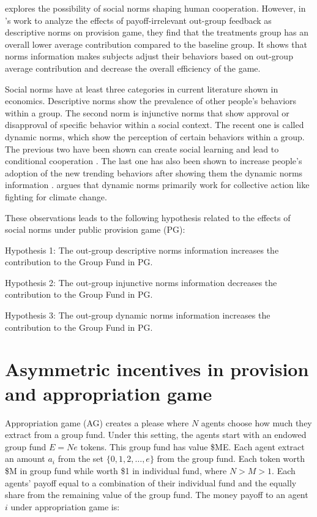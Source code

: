 \documentclass[12pt]{article}
\begin{document}
\cite{fehr2018normative} explores the possibility of social norms shaping human cooperation. However, in \cite{kandul2021public}'s work to analyze the effects of payoff-irrelevant out-group feedback as descriptive norms on provision game, they find that the treatments group has an overall lower average contribution compared to the baseline group. It shows that norms information makes subjects adjust their behaviors based on out-group average contribution and decrease the overall efficiency of the game. 

Social norms have at least three categories in current literature shown in economics. Descriptive norms show the prevalence of other people’s behaviors within a group. The second norm is injunctive norms that show approval or disapproval of specific behavior within a social context. The recent one is called dynamic norms, which show the perception of certain behaviors within a group. The previous two have been shown can create social learning and lead to conditional cooperation \citep{cai2009observational,alpizar2008anonymity}. The last one has also been shown to increase people’s adoption of the new trending behaviors after showing them the dynamic norms information \citep{sparkman2017dynamic}. \cite{sparkman2021social} argues that dynamic norms primarily work for collective action like fighting for climate change.

These observations leads to the following hypothesis related to the effects of social norms under public provision game (PG):

Hypothesis 1: 
The out-group descriptive norms information increases the contribution to the Group Fund in PG.

Hypothesis 2:
The out-group injunctive norms information decreases the contribution to the Group Fund in PG. 

Hypothesis 3:
The out-group dynamic norms information increases the contribution to the Group Fund in PG.

\section{Asymmetric incentives in provision and appropriation game}

Appropriation game (AG) creates a please where $N$ agents choose how much they extract from a group fund. Under this setting, the agents start with an endowed group fund $E = Ne$ tokens. This group fund has value \$ME. Each agent extract an amount $a_i$ from the set $\{0,1,2,…,e\}$ from the group fund. Each token worth \$M in group fund while worth \$1 in individual fund, where $N>M>1$. Each agents’ payoff equal to a combination of their individual fund and the equally share from the remaining value of the group fund. The money payoff to an agent $i$ under appropriation game is:
\end{document}
